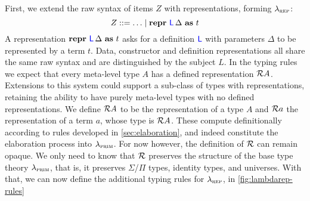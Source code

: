 First, we extend the raw syntax of items $Z$ with representations, forming
$\lambda_{\textsc{rep}}$:
\[
  Z ::= \ldots \mid \textbf{repr} \ {\color{blue}{\mathsf{L}}}\, {\Delta}\ \textbf{as}\ {t}
\]
A representation $\textbf{repr} \ {\color{blue}{\mathsf{L}}}\, {\Delta}\ \textbf{as}\ {t}$ asks for a definition ${\color{blue}{\mathsf{L}}}$ with
parameters $\Delta$ to be represented by a term $t$. Data, constructor and
definition representations all share the same raw syntax and are distinguished
by the subject $L$. In the typing rules we expect that every meta-level type
$A$ has a defined representation $\mathcal{R} {A}$. Extensions to this system could
support a sub-class of types with representations, retaining the ability to
have purely meta-level types with no defined representations. We define
$\mathcal{R} {A}$ to be the representation of a type $A$ and $\mathcal{R} {a}$ the
representation of a term $a$, whose type is $\mathcal{R} {A}$. These compute
definitionally according to rules developed in \cref{sec:elaboration}, and
indeed constitute the elaboration process into $\lambda_{\textsc{prim}}$. For now however,
the definition of $\mathcal{R} {}$ can remain opaque. We only need to know that
$\mathcal{R} {}$ preserves the structure of the base type theory $\lambda_{\textsc{prim}}$, that
is, it preserves $\Sigma$/$\Pi$ types, identity types, and universes. With
that, we can now define the additional typing rules for $\lambda_{\textsc{rep}}$, in
\cref{fig:lambdarep-rules}

